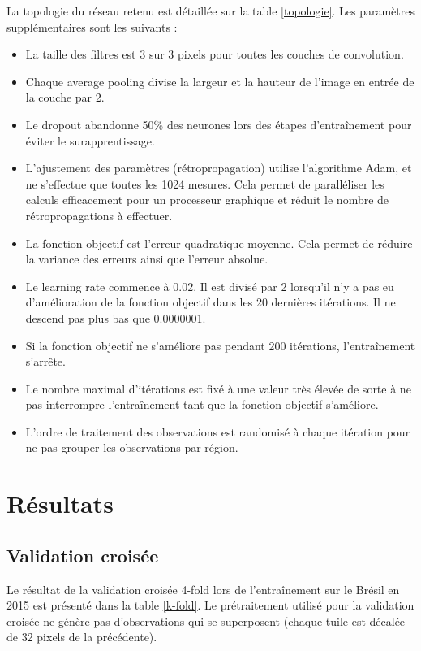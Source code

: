 \documentclass[a4paper, 11pt]{report}
\begin{document}
La topologie du réseau retenu est détaillée sur la table \ref{topologie}.
Les paramètres supplémentaires sont les suivants :
\begin{itemize}
	\item La taille des filtres est 3 sur 3 pixels pour toutes les couches de convolution.
	\item Chaque average pooling divise la largeur et la hauteur de l'image en entrée de la couche par 2.
	\item Le dropout abandonne 50\% des neurones lors des étapes d'entraînement pour éviter le surapprentissage.
	\item L'ajustement des paramètres (rétropropagation) utilise l'algorithme Adam, et ne s'effectue que toutes les 1024 mesures. Cela permet de paralléliser les calculs efficacement pour un processeur graphique et réduit le nombre de rétropropagations à effectuer.
	\item La fonction objectif est l'erreur quadratique moyenne. Cela permet de réduire la variance des erreurs ainsi que l'erreur absolue.
	\item Le learning rate commence à 0.02. Il est divisé par 2 lorsqu'il n'y a pas eu d'amélioration de la fonction objectif dans les 20 dernières itérations. Il ne descend pas plus bas que 0.0000001.
	\item Si la fonction objectif ne s'améliore pas pendant 200 itérations, l'entraînement s'arrête.
	\item Le nombre maximal d'itérations est fixé à une valeur très élevée de sorte à ne pas interrompre l'entraînement tant que la fonction objectif s'améliore.
	\item L'ordre de traitement des observations est randomisé à chaque itération pour ne pas grouper les observations par région.
\end{itemize}

\section{Résultats}
\subsection{Validation croisée}
Le résultat de la validation croisée 4-fold lors de l'entraînement sur le Brésil en 2015 est présenté dans la table \ref{k-fold}. Le prétraitement utilisé pour la validation croisée ne génère pas d'observations qui se superposent (chaque tuile est décalée de 32 pixels de la précédente).
\end{document}
